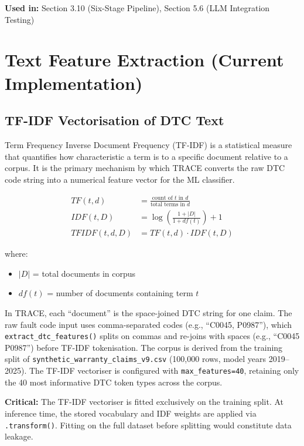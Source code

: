 \documentclass[10pt]{article}
\begin{document}
\textbf{Used in:} Section 3.10 (Six-Stage Pipeline), Section 5.6 (LLM Integration Testing)

\section{Text Feature Extraction (Current Implementation)}

\subsection{TF-IDF Vectorisation of DTC Text}

Term Frequency Inverse Document Frequency (TF-IDF) is a statistical measure that quantifies how characteristic a term is to a specific document relative to a corpus. It is the primary mechanism by which TRACE converts the raw DTC code string into a numerical feature vector for the ML classifier.

\begin{align}
TF(t,d) &= \frac{\text{count of } t \text{ in } d}{\text{total terms in } d} \\
IDF(t,D) &= \log\left(\frac{1 + |D|}{1 + df(t)}\right) + 1 \\
TFIDF(t,d,D) &= TF(t,d) \cdot IDF(t,D)
\end{align}

where:
\begin{itemize}
    \item \(|D|\) = total documents in corpus
    \item \(df(t)\) = number of documents containing term \(t\)
\end{itemize}

In TRACE, each ``document'' is the space-joined DTC string for one claim. The raw fault code input uses comma-separated codes (e.g., ``C0045, P0987''), which \texttt{extract\_dtc\_features()} splits on commas and re-joins with spaces (e.g., ``C0045 P0987'') before TF-IDF tokenisation. The corpus is derived from the training split of \texttt{synthetic\_warranty\_claims\_v9.csv} (100{,}000 rows, model years 2019--2025). The TF-IDF vectoriser is configured with \texttt{max\_features=40}, retaining only the 40 most informative DTC token types across the corpus.

\textbf{Critical:} The TF-IDF vectoriser is fitted exclusively on the training split. At inference time, the stored vocabulary and IDF weights are applied via \texttt{.transform()}. Fitting on the full dataset before splitting would constitute data leakage.
\end{document}
